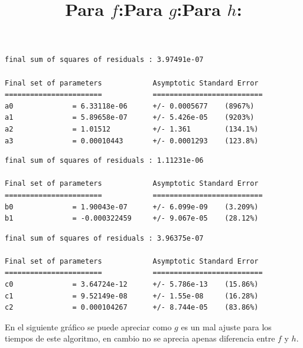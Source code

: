 \documentclass[a4]{article}
\begin{document}
\title{Para $f$:}
\begin{verbatim}
final sum of squares of residuals : 3.97491e-07

Final set of parameters            Asymptotic Standard Error
=======================            ==========================
a0              = 6.33118e-06      +/- 0.0005677    (8967%)
a1              = 5.89658e-07      +/- 5.426e-05    (9203%)
a2              = 1.01512          +/- 1.361        (134.1%)
a3              = 0.00010443       +/- 0.0001293    (123.8%)
\end{verbatim}
\title{Para $g$:}
\begin{verbatim}
final sum of squares of residuals : 1.11231e-06

Final set of parameters            Asymptotic Standard Error
=======================            ==========================
b0              = 1.90043e-07      +/- 6.099e-09    (3.209%)
b1              = -0.000322459     +/- 9.067e-05    (28.12%)
\end{verbatim}

\title{Para $h$:}
\begin{verbatim}
final sum of squares of residuals : 3.96375e-07

Final set of parameters            Asymptotic Standard Error
=======================            ==========================
c0              = 3.64724e-12      +/- 5.786e-13    (15.86%)
c1              = 9.52149e-08      +/- 1.55e-08     (16.28%)
c2              = 0.000104267      +/- 8.744e-05    (83.86%)
\end{verbatim}

\newpage

\begin{flushleft}
  En el siguiente gráfico se puede apreciar como $g$ es un mal ajuste
  para los tiempos de este algoritmo, en cambio no se aprecia apenas
diferencia entre $f$ y $h$.
\end{flushleft}

\begin{figure}[H] \centering
{}
\end{figure}
\end{document}
